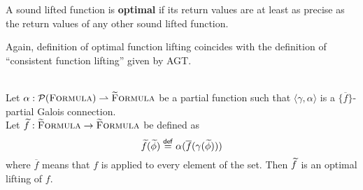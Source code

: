 \begin{definition}
    A sound lifted function is \textbf{optimal} if its return values are at least as precise as the return values of any other sound lifted function.
\end{definition}

Again, definition of optimal function lifting coincides with the definition of “consistent function lifting” given by AGT.
\begin{lemma}\label{lemma:consistent-func-lifting-direct}~\\
    Let $\alpha : \mathcal{P}(\textup{\textsc{Formula}}) \rightharpoonup \textup{\textsc{\ensuremath{\widetilde{\text{F}}}ormula}}$ be a partial function such that $\langle \gamma, \alpha \rangle$ is a $\{ \overline{f} \}$-partial Galois connection.\\ 
    Let $\widetilde{f} : \textup{\textsc{\ensuremath{\widetilde{\text{F}}}ormula}} \rightarrow \textup{\textsc{\ensuremath{\widetilde{\text{F}}}ormula}}$ be defined as
    \begin{displaymath}
    \widetilde{f}(\widetilde{\phi}) \overset{\textup{\textmd{\textsf{def}}}}{=} \alpha(\overline{f}(\gamma(\widetilde{\phi})))
    \end{displaymath}
    where $\overline{f}$ means that $f$ is applied to every element of the set.
    Then $\widetilde{f}$ is an optimal lifting of $f$.
\end{lemma} %
